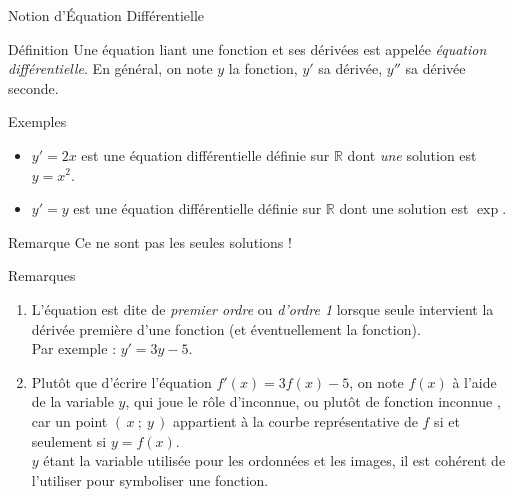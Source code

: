 \documentclass{coursbook}
\begin{document}
    \begin{Gpartie}{Notion d'Équation Différentielle} 
        \begin{Spartie}{Définition} 
            Une équation liant une fonction et ses dérivées est appelée \emph{équation différentielle}. En général, on note $y$ la fonction, $y'$ sa dérivée, $y''$ sa dérivée seconde.
        \end{Spartie}
        \begin{Spartie}{Exemples} 
            \begin{itemize}
                \item $y'=2x$ est une équation différentielle définie sur $\mathbb{R}$ dont \textit{une} solution est~$y=x^2$.
                \item $y'=y$ est une équation différentielle définie sur $\mathbb{R}$ dont une solution est $\exp$.
            \end{itemize}
            \begin{SSpartie}{Remarque} 
                Ce ne sont pas les seules solutions !
            \end{SSpartie}
        \end{Spartie}
        \begin{Spartie}{Remarques} 
            \begin{enumerate}[(1)]
                \item L'équation est dite de \emph{premier ordre} ou \emph{d'ordre 1} lorsque seule intervient la dérivée première d'une fonction (et éventuellement la fonction). \\ Par exemple : $y'=3y-5$.
                \item Plutôt que d'écrire l'équation $f'(x)=3f(x)-5$, on note $f(x)$ à l'aide de la variable $y$, qui joue le rôle d'inconnue, ou plutôt de \og fonction inconnue \fg{}, car un point $(\,x~;~y\,)$ appartient à la courbe représentative de $f$ si et seulement si $y=f(x)$. \\ $y$ étant la variable utilisée pour les ordonnées et les images, il est cohérent de l'utiliser pour symboliser une fonction.
            \end{enumerate}
        \end{Spartie}
    \end{Gpartie}
\end{document}

